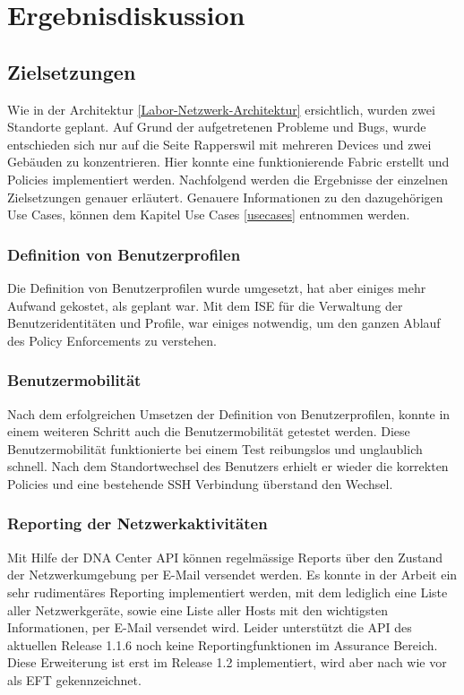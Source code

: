\section{Ergebnisdiskussion}


\subsection{Zielsetzungen}
Wie in der Architektur \ref{Labor-Netzwerk-Architektur} ersichtlich, wurden zwei Standorte geplant. Auf Grund der aufgetretenen Probleme und Bugs, wurde entschieden sich nur auf die Seite Rapperswil mit mehreren Devices und zwei Gebäuden zu konzentrieren. Hier konnte eine funktionierende Fabric erstellt und Policies implementiert werden. Nachfolgend werden die Ergebnisse der einzelnen Zielsetzungen genauer erläutert. Genauere Informationen zu den dazugehörigen Use Cases, können dem Kapitel Use Cases \ref{usecases} entnommen werden.

\subsubsection{Definition von Benutzerprofilen} 
Die Definition von Benutzerprofilen wurde umgesetzt, hat aber einiges mehr Aufwand gekostet, als geplant war. Mit dem ISE für die Verwaltung der Benutzeridentitäten und Profile, war einiges notwendig, um den ganzen Ablauf des Policy Enforcements zu verstehen.

\subsubsection{Benutzermobilität}
Nach dem erfolgreichen Umsetzen der Definition von Benutzerprofilen, konnte in einem weiteren Schritt auch die Benutzermobilität getestet werden. Diese Benutzermobilität funktionierte bei einem Test reibungslos und unglaublich schnell. Nach dem Standortwechsel des Benutzers erhielt er wieder die korrekten Policies und eine bestehende SSH Verbindung überstand den Wechsel.

\subsubsection{Reporting der Netzwerkaktivitäten}
Mit Hilfe der DNA Center API können regelmässige Reports über den Zustand der Netzwerkumgebung per E-Mail versendet werden. Es konnte in der Arbeit ein sehr rudimentäres Reporting implementiert werden, mit dem lediglich eine Liste aller Netzwerkgeräte, sowie eine Liste aller Hosts mit den wichtigsten Informationen, per E-Mail versendet wird. Leider unterstützt die API des aktuellen Release 1.1.6 noch keine Reportingfunktionen im Assurance Bereich. Diese Erweiterung ist erst im Release 1.2 implementiert, wird aber nach wie vor als EFT gekennzeichnet.

